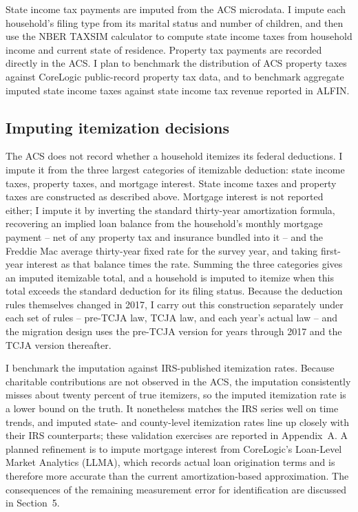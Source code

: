 \documentclass[12pt]{article}
\begin{document}
State income tax payments are imputed from the ACS microdata. I impute each household's filing type from its marital status and number of children, and then use the NBER TAXSIM calculator to compute state income taxes from household income and current state of residence. Property tax payments are recorded directly in the ACS. I plan to benchmark the distribution of ACS property taxes against CoreLogic public-record property tax data, and to benchmark aggregate imputed state income taxes against state income tax revenue reported in ALFIN.

\subsection*{Imputing itemization decisions}

The ACS does not record whether a household itemizes its federal deductions. I impute it from the three largest categories of itemizable deduction: state income taxes, property taxes, and mortgage interest. State income taxes and property taxes are constructed as described above. Mortgage interest is not reported either; I impute it by inverting the standard thirty-year amortization formula, recovering an implied loan balance from the household's monthly mortgage payment -- net of any property tax and insurance bundled into it -- and the Freddie Mac average thirty-year fixed rate for the survey year, and taking first-year interest as that balance times the rate. Summing the three categories gives an imputed itemizable total, and a household is imputed to itemize when this total exceeds the standard deduction for its filing status. Because the deduction rules themselves changed in 2017, I carry out this construction separately under each set of rules -- pre-TCJA law, TCJA law, and each year's actual law -- and the migration design uses the pre-TCJA version for years through 2017 and the TCJA version thereafter.

I benchmark the imputation against IRS-published itemization rates. Because charitable contributions are not observed in the ACS, the imputation consistently misses about twenty percent of true itemizers, so the imputed itemization rate is a lower bound on the truth. It nonetheless matches the IRS series well on time trends, and imputed state- and county-level itemization rates line up closely with their IRS counterparts; these validation exercises are reported in Appendix~A. A planned refinement is to impute mortgage interest from CoreLogic's Loan-Level Market Analytics (LLMA), which records actual loan origination terms and is therefore more accurate than the current amortization-based approximation. The consequences of the remaining measurement error for identification are discussed in Section~5.
\end{document}
